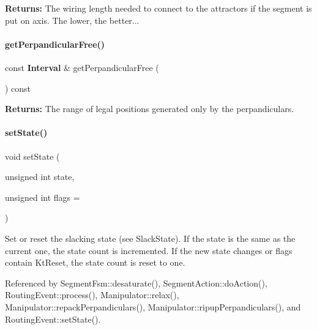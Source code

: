 {\bfseries Returns\+:} The wiring length needed to connect to the attractors if the segment is put on {\ttfamily axis}. The lower, the better... \mbox{\label{classKite_1_1DataNegociate_a60d12d642a8d232241a2b07febeb980b}} 
\paragraph{\texorpdfstring{get\+Perpandicular\+Free()}{getPerpandicularFree()}}
{\footnotesize\ttfamily const \textbf{ Interval} \& get\+Perpandicular\+Free (\begin{DoxyParamCaption}{ }\end{DoxyParamCaption}) const\hspace{0.3cm}{\ttfamily [inline]}}

{\bfseries Returns\+:} The range of legal positions generated only by the perpandiculars. \mbox{\label{classKite_1_1DataNegociate_aafc8cd0dcd351625a12904bed7d5a7d1}} 
\paragraph{\texorpdfstring{set\+State()}{setState()}}
{\footnotesize\ttfamily void set\+State (\begin{DoxyParamCaption}\item[{unsigned int}]{state,  }\item[{unsigned int}]{flags = {} }\end{DoxyParamCaption})\hspace{0.3cm}{\ttfamily [inline]}}

Set or reset the slacking state (see Slack\+State). If the {\ttfamily state} is the same as the current one, the state count is incremented. If the new state changes or {\ttfamily flags} contain Kt\+Reset, the state count is reset to one. 

Referenced by Segment\+Fsm\+::desaturate(), Segment\+Action\+::do\+Action(), Routing\+Event\+::process(), Manipulator\+::relax(), Manipulator\+::repack\+Perpandiculars(), Manipulator\+::ripup\+Perpandiculars(), and Routing\+Event\+::set\+State().

